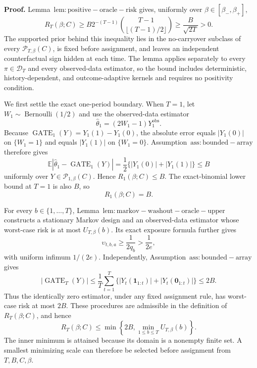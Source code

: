 \textbf{Proof.} Lemma~\(\mathrm{lem:positive-oracle-risk}\) gives, uniformly over \(\beta\in[\beta_-,\beta_+]\),
\[
R_T(\beta;C)
\ge B2^{-(T-1)}\binom{T-1}{\lfloor(T-1)/2\rfloor}
\ge\frac{B}{\sqrt{2T}}>0.
\]
The supported prior behind this inequality lies in the no-carryover subclass of every \(\mathcal P_{T,\beta}(C)\), is fixed before assignment, and leaves an independent counterfactual sign hidden at each time. The lemma applies separately to every \(\pi\in\mathcal D_T\) and every observed-data estimator, so the bound includes deterministic, history-dependent, and outcome-adaptive kernels and requires no positivity condition.

We first settle the exact one-period boundary. When \(T=1\), let \(W_1\sim\operatorname{Bernoulli}(1/2)\) and use the observed-data estimator
\[
\widehat\theta_1=(2W_1-1)Y_1^{\mathrm{obs}}.
\]
Because \(\operatorname{GATE}_1(Y)=Y_1(1)-Y_1(0)\), the absolute error equals \(|Y_1(0)|\) on \(\{W_1=1\}\) and equals \(|Y_1(1)|\) on \(\{W_1=0\}\). Assumption~\(\mathrm{ass:bounded-array}\) therefore gives
\[
\mathbb E|\widehat\theta_1-\operatorname{GATE}_1(Y)|
=\frac12\{|Y_1(0)|+|Y_1(1)|\}\le B
\]
uniformly over \(Y\in\mathcal P_{1,\beta}(C)\). Hence \(R_1(\beta;C)\le B\). The exact-binomial lower bound at \(T=1\) is also \(B\), so
\[
R_1(\beta;C)=B.
\]

For every \(b\in\{1,\ldots,T\}\), Lemma~\(\mathrm{lem:markov-washout-oracle-upper}\) constructs a stationary Markov design and an observed-data estimator whose worst-case risk is at most \(U_{T,\beta}(b)\). Its exact exposure formula further gives
\[
\upsilon_{t,b,a}\ge\frac{1}{2q_b}>\frac{1}{2e},
\]
with uniform infimum \(1/(2e)\). Independently, Assumption~\(\mathrm{ass:bounded-array}\) gives
\[
|\operatorname{GATE}_T(Y)|
\le\frac1T\sum_{t=1}^T\{|Y_t(\mathbf1_{1:t})|+|Y_t(\mathbf0_{1:t})|\}
\le2B.
\]
Thus the identically zero estimator, under any fixed assignment rule, has worst-case risk at most \(2B\). These procedures are admissible in the definition of \(R_T(\beta;C)\), and hence
\[
R_T(\beta;C)
\le\min\left\{2B,\min_{1\le b\le T}U_{T,\beta}(b)\right\}.
\]
The inner minimum is attained because its domain is a nonempty finite set. A smallest minimizing scale can therefore be selected before assignment from \(T,B,C,\beta\).

